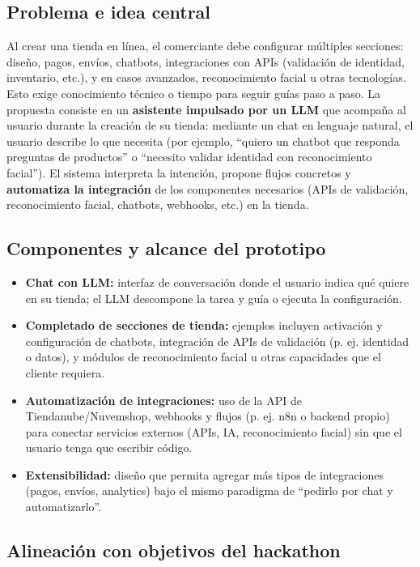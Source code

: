 \documentclass[9pt,a4paper,twocolumn,twoside]{rho-class/rho}
\begin{document}
\subsection{Problema e idea central}

Al crear una tienda en línea, el comerciante debe configurar múltiples secciones: diseño, pagos, envíos, chatbots, integraciones con APIs (validación de identidad, inventario, etc.), y en casos avanzados, reconocimiento facial u otras tecnologías. Esto exige conocimiento técnico o tiempo para seguir guías paso a paso. La propuesta consiste en un \textbf{asistente impulsado por un LLM} que acompaña al usuario durante la creación de su tienda: mediante un chat en lenguaje natural, el usuario describe lo que necesita (por ejemplo, ``quiero un chatbot que responda preguntas de productos'' o ``necesito validar identidad con reconocimiento facial''). El sistema interpreta la intención, propone flujos concretos y \textbf{automatiza la integración} de los componentes necesarios (APIs de validación, reconocimiento facial, chatbots, webhooks, etc.) en la tienda.

\subsection{Componentes y alcance del prototipo}

\begin{itemize}
    \item \textbf{Chat con LLM:} interfaz de conversación donde el usuario indica qué quiere en su tienda; el LLM descompone la tarea y guía o ejecuta la configuración.
    \item \textbf{Completado de secciones de tienda:} ejemplos incluyen activación y configuración de chatbots, integración de APIs de validación (p. ej. identidad o datos), y módulos de reconocimiento facial u otras capacidades que el cliente requiera.
    \item \textbf{Automatización de integraciones:} uso de la API de Tiendanube/Nuvemshop, webhooks y flujos (p. ej. n8n o backend propio) para conectar servicios externos (APIs, IA, reconocimiento facial) sin que el usuario tenga que escribir código.
    \item \textbf{Extensibilidad:} diseño que permita agregar más tipos de integraciones (pagos, envíos, analytics) bajo el mismo paradigma de ``pedirlo por chat y automatizarlo''.
\end{itemize}

\subsection{Alineación con objetivos del hackathon}
\end{document}
